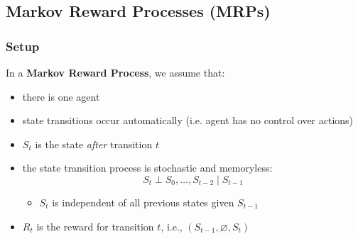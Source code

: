 \subsection{Markov Reward Processes (MRPs)}
\subsubsection{Setup}
\begin{summary}
    In a \textbf{Markov Reward Process}, we assume that:
    \begin{itemize}
        \item there is one agent
        \item state transitions occur automatically (i.e. agent has no control over actions)
        \item $S_t$ is the state \textit{after} transition $t$
        \item the state transition process is stochastic and memoryless:
        \[
        S_t \perp S_0, \dots, S_{t-2} \mid S_{t-1}
        \]
        \begin{itemize}
            \item $S_t$ is independent of all previous states given $S_{t-1}$
        \end{itemize}
        \item $R_t$ is the reward for transition $t$, i.e., $(S_{t-1}, \varnothing, S_t)$
    \end{itemize}
    \vspace{1em}


\end{summary}
